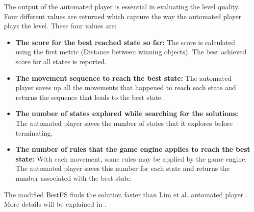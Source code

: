 The output of the automated player is essential in evaluating the level quality. Four different values are returned which capture the way the automated player plays the level. These four values are:
\begin{itemize} \itemsep0pt \parskip0pt 
	\item \textbf{The score for the best reached state so far:} The score is calculated using the first metric (Distance between winning objects). The best achieved score for all states is reported.
	\item \textbf{The movement sequence to reach the best state:} The automated player saves up all the movements that happened to reach each state and returns the sequence that leads to the best state.
	\item \textbf{The number of states explored while searching for the solutions:} The automated player saves the number of states that it explores before terminating.
	\item \textbf{The number of rules that the game engine applies to reach the best state:} With each movement, some rules may be applied by the game engine. The automated player saves this number for each state and returns the number associated with the best state.
\end{itemize}
The modified BestFS finds the solution faster than Lim et al. automated player \cite{puzzleScriptGeneration}. More details will be explained in .\\\par

